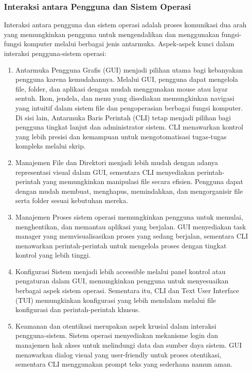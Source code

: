 \documentclass[12pt]{article}
\begin{document}
\subsubsection{Interaksi antara Pengguna dan Sistem Operasi}

 Interaksi antara pengguna dan sistem operasi adalah proses komunikasi dua arah yang memungkinkan pengguna untuk mengendalikan dan menggunakan fungsi-fungsi komputer melalui berbagai jenis antarmuka. Aspek-aspek kunci dalam interaksi pengguna-sistem operasi:

\begin{enumerate}
\item Antarmuka Pengguna
     Grafis (GUI) menjadi pilihan utama bagi kebanyakan pengguna karena kemudahannya. Melalui GUI, pengguna dapat mengelola file, folder, dan aplikasi dengan mudah menggunakan mouse atau layar sentuh. Ikon, jendela, dan menu yang disediakan memungkinkan navigasi yang intuitif dalam sistem file dan pengoperasian berbagai fungsi komputer. Di sisi lain, Antarmuka Baris Perintah (CLI) tetap menjadi pilihan bagi pengguna tingkat lanjut dan administrator sistem. CLI menawarkan kontrol yang lebih presisi dan kemampuan untuk mengotomatisasi tugas-tugas kompleks melalui skrip.

\item {Manajemen File dan Direktori}
    menjadi lebih mudah dengan adanya representasi visual dalam GUI, sementara CLI menyediakan perintah-perintah yang memungkinkan manipulasi file secara efisien. Pengguna dapat dengan mudah membuat, menghapus, memindahkan, dan mengorganisir file serta folder sesuai kebutuhan mereka.

\item {Manajemen Proses}
    sistem operasi memungkinkan pengguna untuk memulai, menghentikan, dan memantau aplikasi yang berjalan. GUI menyediakan task manager yang memvisualisasikan proses yang sedang berjalan, sementara CLI menawarkan perintah-perintah untuk mengelola proses dengan tingkat kontrol yang lebih tinggi.

  \item {Konfigurasi Sistem}
     menjadi lebih accessible melalui panel kontrol atau pengaturan dalam GUI, memungkinkan pengguna untuk menyesuaikan berbagai aspek sistem operasi. Sementara itu, CLI dan Text User Interface (TUI) memungkinkan konfigurasi yang lebih mendalam melalui file konfigurasi dan perintah-perintah khusus.

  \item {Keamanan dan otentikasi}
    merupakan aspek krusial dalam interaksi pengguna-sistem. Sistem operasi menyediakan mekanisme login dan manajemen hak akses untuk melindungi data dan sumber daya sistem. GUI menawarkan dialog visual yang user-friendly untuk proses otentikasi, sementara CLI menggunakan prompt teks yang sederhana namun aman.


\end{enumerate}
\end{document}
